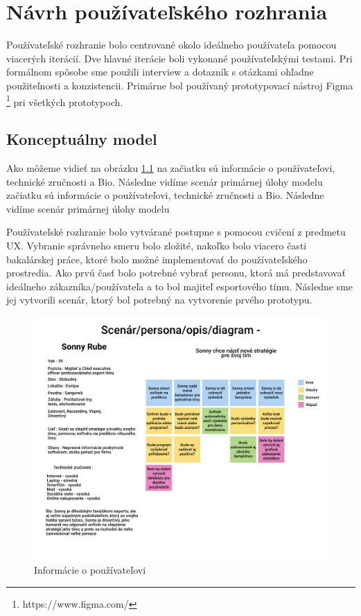 {}
\chapter{Návrh používateľského rozhrania}

\label{summary}

Používateľské rozhranie bolo centrované okolo ideálneho používateľa pomocou viacerých iterácií. Dve hlavné iterácie boli vykonané používateľskými testami. Pri formálnom spôsobe sme použili interview a dotazník s otázkami ohľadne použiteľnosti a konzistencii. Primárne bol používaný prototypovací nástroj Figma \footnote{https://www.figma.com/} pri všetkých prototypoch.



\section{Konceptuálny model}

	Ako môžeme vidieť na obrázku \ref{scenar} na začiatku sú informácie o používateľovi, technické zručnosti a Bio. Následne vidíme scenár primárnej úlohy modelu začiatku sú informácie o používateľovi, technické zručnosti a Bio. Následne vidíme scenár primárnej úlohy modelu

Používateľské rozhranie bolo vytvárané postupne s pomocou cvičení z predmetu UX. Vybranie správneho smeru bolo zložité, nakoľko bolo viacero časti bakalárskej práce, ktoré bolo možné implementovať do používateľského prostredia. Ako prvú časť bolo potrebné vybrať personu, ktorá má predstavovať ideálneho zákazníka/používateľa a to bol majiteľ esportového tímu. Následne sme jej vytvorili scenár, ktorý bol potrebný na vytvorenie prvého prototypu. 

\begin{figure}[h!]
	
	\includegraphics[width=.9\textwidth]{figures/scenar}
	
	\centering
	
	\caption{ Informácie o používateľovi \label{scenar}}
	
\end{figure}

